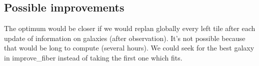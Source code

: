 \documentclass[10pt]{extarticle}
\begin{document}
\begin{multicols}{2}
\section{Possible improvements}
The optimum would be closer if we would replan globally every left tile after each update of information on galaxies (after observation). It's not possible because that would be long to compute (several hours).
We could seek for the best galaxy in improve\_fiber instead of taking the first one which fits.
\end{multicols}
\end{document}
